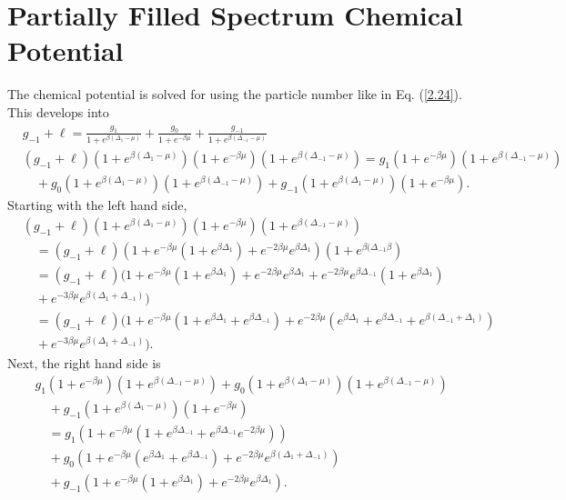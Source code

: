 \section{Partially Filled Spectrum Chemical Potential} \label{section:c2}
The chemical potential is solved for using the particle number like in Eq. (\ref{2.24}). This develops into  
\begin{align}
    &g_{-1}+\ell=\frac{g_1}{1+e^{\beta(\Delta_1-\mu)}}+\frac{g_0}{1+e^{-\beta\mu}}+\frac{g_{-1}}{1+e^{\beta(\Delta_{-1}-\mu)}}\\
    &(g_{-1}+\ell)(1+e^{\beta(\Delta_1-\mu)})(1+e^{-\beta\mu})(1+e^{\beta(\Delta_{-1}-\mu)})=g_1(1+e^{-\beta\mu})(1+e^{\beta(\Delta_{-1}-\mu)})\nonumber\\
    &\quad+g_0(1+e^{\beta(\Delta_1-\mu)})(1+e^{\beta(\Delta_{-1}-\mu)})+g_{-1}(1+e^{\beta(\Delta_1-\mu)})(1+e^{-\beta\mu}).
    \end{align}
Starting with the left hand side,
\begin{align}
    &(g_{-1}+\ell)(1+e^{\beta(\Delta_1-\mu)})(1+e^{-\beta\mu})(1+e^{\beta(\Delta_{-1}-\mu)})\nonumber\\
    &\quad=(g_{-1}+\ell)(1+e^{-\beta\mu}(1+e^{\beta\Delta_1})+e^{-2\beta\mu}e^{\beta\Delta_1})(1+e^{\beta(\Delta_{-1}\beta})\nonumber\\
    &\quad=(g_{-1}+\ell)(1+e^{-\beta\mu}(1+e^{\beta\Delta_1})+e^{-2\beta\mu}e^{\beta\Delta_1}+e^{-2\beta\mu}e^{\beta\Delta_{-1}}(1+e^{\beta\Delta_1})\nonumber\\
    &\quad+e^{-3\beta\mu}e^{\beta(\Delta_1+\Delta_{-1})})\nonumber\\
    &\quad=(g_{-1}+\ell)(1+e^{-\beta\mu}(1+e^{\beta\Delta_1}+e^{\beta\Delta_{-1}})+e^{-2\beta\mu}(e^{\beta\Delta_1}+e^{\beta\Delta_{-1}}+e^{\beta(\Delta_{-1}+\Delta_1)})\nonumber\\
    &\quad+e^{-3\beta\mu}e^{\beta(\Delta_1+\Delta_{-1})}).
\end{align}
Next, the right hand side is
\begin{align}
    &g_1(1+e^{-\beta\mu})(1+e^{\beta(\Delta_{-1}-\mu)})+g_0(1+e^{\beta(\Delta_1-\mu)})(1+e^{\beta(\Delta_{-1}-\mu)})\nonumber\\
    &\quad+g_{-1}(1+e^{\beta(\Delta_1-\mu)})(1+e^{-\beta\mu})\label{C8}\\
    &\quad=g_1(1+e^{-\beta\mu}(1+e^{\beta\Delta_{-1}}+e^{\beta\Delta_{-1}}e^{-2\beta\mu}))\nonumber\\
    &\quad+g_0(1+e^{-\beta\mu}(e^{\beta\Delta_1}+e^{\beta\Delta_{-1}})+e^{-2\beta\mu}e^{\beta(\Delta_1+\Delta_{-1})})\nonumber\\
    &\quad+g_{-1}(1+e^{-\beta\mu}(1+e^{\beta\Delta_1})+e^{-2\beta\mu}e^{\beta\Delta_1}). \label{C9}
\end{align}
